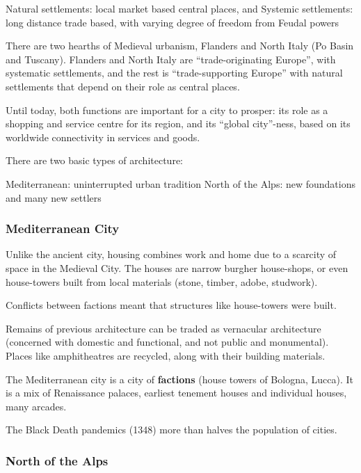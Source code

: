 \documentclass{article}
\begin{document}
\begin{outline}
	\1 Natural settlements: local market based central places, and
	\1 Systemic settlements: long distance trade based, with varying degree of freedom from Feudal powers
\end{outline}

There are two hearths of Medieval urbanism, Flanders and North Italy (Po Basin and Tuscany). Flanders and North Italy are ``trade-originating Europe'', with systematic settlements, and the rest is ``trade-supporting Europe'' with natural settlements that depend on their role as central places.

Until today, both functions are important for a city to prosper: its role as a shopping and service centre for its region, and its ``global city''-ness, based on its worldwide connectivity in services and goods.

There are two basic types of architecture:

\begin{outline}
	\1 Mediterranean: uninterrupted urban tradition
	\1 North of the Alps: new foundations and many new settlers
\end{outline}

\subsubsection{Mediterranean City}

Unlike the ancient city, housing combines work and home due to a scarcity of space in the Medieval City. The houses are narrow burgher house-shops, or even house-towers built from local materials (stone, timber, adobe, studwork).

Conflicts between factions meant that structures like house-towers were built.

Remains of previous architecture can be traded as vernacular architecture (concerned with domestic and functional, and not public and monumental). Places like amphitheatres are recycled, along with their building materials.

The Mediterranean city is a city of \textbf{factions} (house towers of Bologna, Lucca). It is a mix of Renaissance palaces, earliest tenement houses and individual houses, many arcades.

The Black Death pandemics (1348) more than halves the population of cities. 

\subsubsection{North of the Alps}
\end{document}
